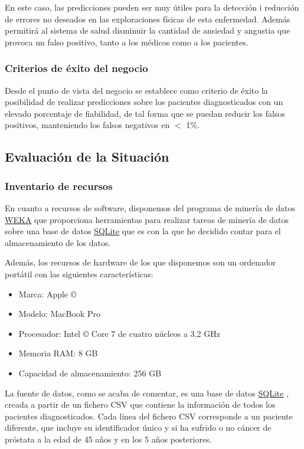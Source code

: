 \documentclass{article}
\begin{document}
En este caso, las predicciones pueden ser muy útiles para la detección i reducción de errores no deseados en las exploraciones físicas de esta enfermedad. Además permitirá al sistema de salud disminuir la cantidad de ansiedad y angustia
que provoca un falso positivo, tanto a los médicos como a los pacientes.
	
\subsubsection{Criterios de éxito del negocio}
Desde el punto de vista del negocio se establece como criterio de éxito la posibilidad de realizar predicciones sobre los pacientes diagnosticados con un elevado porcentaje de fiabilidad, de tal forma que se puedan reducir los falsos positivos, manteniendo los falsos negativos en $<$ 1\%.

\subsection{Evaluación de la Situación}

\subsubsection{Inventario de recursos}\label{Inventario de recursos}
En cuanto a recursos de software, disponemos del programa de minería de datos \href{https://www.cs.waikato.ac.nz/~ml/weka/}{WEKA} que proporciona herramientas para realizar tareas de minería de datos sobre una base de datos \href{https://www.sqlite.org/copyright.html}{SQLite} que es con la que he decidido contar para el almacenamiento de los datos. 

\newpage
Además, los recursos de hardware de los que disponemos son un ordenador portátil con las siguientes características:

\begin{itemize}
	\item Marca: Apple ©
	\item Modelo: MacBook Pro
	\item Procesador: Intel © Core 7 de cuatro núcleos a 3,2 GHz
	\item Memoria RAM: 8 GB
	\item Capacidad de almacenamiento: 256 GB
\end{itemize}

La fuente de datos, como se acaba de comentar, es una base de datos \href{https://www.sqlite.org/copyright.html}{SQLite} , creada a partir de un fichero CSV que contiene la información de todos los pacientes diagnosticados. Cada línea del fichero CSV corresponde a un paciente diferente, que incluye su identificador único y si ha sufrido o no cáncer de próstata a la edad de 45 años y en los 5 años posteriores.
\end{document}
